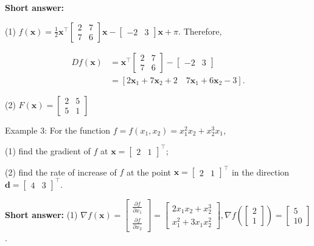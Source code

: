 \noindent
\textbf{Short answer:}

(1) \(f(\boldsymbol{x})=\frac{1}{2} \boldsymbol{x}^{\top}\left[\begin{array}{ll}2 & 7 \\ 7 & 6\end{array}\right] \boldsymbol{x}-\left[\begin{array}{ll}-2 & 3\end{array}\right] \boldsymbol{x}+\pi\). Therefore,

\begin{equation*}
	\begin{aligned}
		D f(\boldsymbol{x}) & =\boldsymbol{x}^{\top}\left[\begin{array}{ll}
			2 & 7 \\
			7 & 6
		\end{array}\right]-\left[\begin{array}{ll}
			-2 & 3
		\end{array}\right] \\
		& =\left[2 \boldsymbol{x}_{1}+7 \boldsymbol{x}_{2}+2 \quad 7 \boldsymbol{x}_{1}+6 \boldsymbol{x}_{2}-3\right] .
	\end{aligned}
\end{equation*}

(2) \(F(\boldsymbol{x})=\left[\begin{array}{ll}2 & 5 \\ 5 & 1\end{array}\right]\)

\bigskip
\noindent
Example 3: For the function \(f=f\left(x_{1}, x_{2}\right)=x_{1}^{2} x_{2}+x_{2}^{3} x_{1}\),

(1) find the gradient of \(f\) at \(\boldsymbol{x}=\left[\begin{array}{ll}2 & 1\end{array}\right]^{\top}\);

(2) find the rate of increase of \(f\) at the point \(\boldsymbol{x}=\left[\begin{array}{ll}2 & 1\end{array}\right]^{\top}\) in the direction \(\boldsymbol{d}=\left[\begin{array}{ll}4 & 3\end{array}\right]^{\top}\).

\noindent
\textbf{Short answer:}
(1) \(\nabla f(\boldsymbol{x})=\left[\begin{array}{l}\frac{\partial f}{\partial x_{1}} \\ \frac{\partial f}{\partial x_{2}}\end{array}\right]=\left[\begin{array}{l}2 x_{1} x_{2}+x_{2}^{3} \\ x_{1}^{2}+3 x_{1} x_{2}^{2}\end{array}\right], \nabla f(\left[\begin{array}{c}2 \\ 1\end{array}\right])=\left[\begin{array}{c}5 \\ 10\end{array}\right]\).

